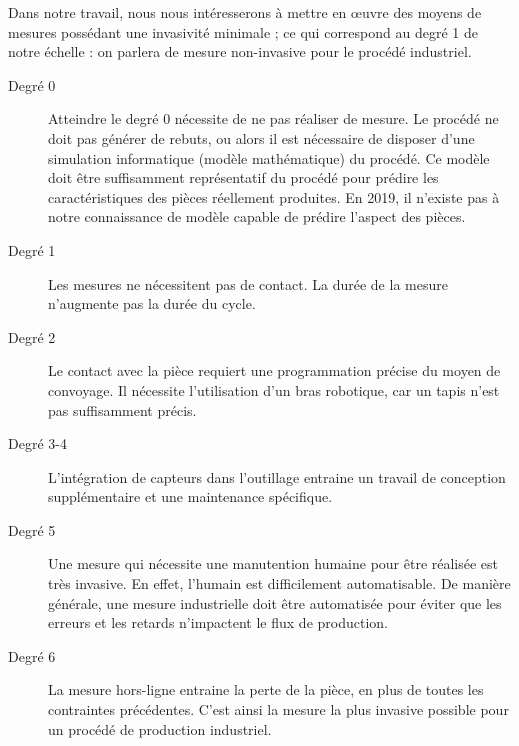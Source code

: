 Dans notre travail, nous nous intéresserons à mettre en œuvre des moyens de mesures possédant une invasivité minimale ; ce qui correspond au degré 1 de notre échelle : on parlera de mesure non-invasive pour le procédé industriel.

\begin{description}
	\item[Degré 0] Atteindre le degré 0 nécessite de ne pas réaliser de mesure.
	Le procédé ne doit pas générer de rebuts, ou alors il est nécessaire de disposer d'une simulation informatique (modèle mathématique) du procédé.
	Ce modèle doit être suffisamment représentatif du procédé pour prédire les caractéristiques des pièces réellement produites.
	En 2019, il n'existe pas à notre connaissance de modèle capable de prédire l'aspect des pièces.
	\item[Degré 1] Les mesures ne nécessitent pas de contact. La durée de la mesure n'augmente pas la durée du cycle.
	\item[Degré 2] Le contact avec la pièce requiert une programmation précise du moyen de convoyage.
	Il nécessite l'utilisation d'un bras robotique, car un tapis n'est pas suffisamment précis.
	\item[Degré 3-4] L'intégration de capteurs dans l'outillage entraine un travail de conception supplémentaire et une maintenance spécifique.
	\item[Degré 5] Une mesure qui nécessite une manutention humaine pour être réalisée est très invasive.
	En effet, l'humain est difficilement automatisable.
	De manière générale, une mesure industrielle doit être automatisée pour éviter que les erreurs et les retards n'impactent le flux de production.
	\item[Degré 6] La mesure hors-ligne entraine la perte de la pièce, en plus de toutes les contraintes précédentes. C'est ainsi la mesure la plus invasive possible pour un procédé de production industriel.
\end{description}


